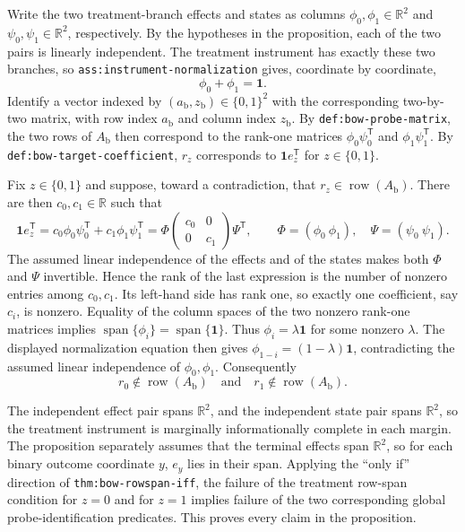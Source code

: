 Write the two treatment-branch effects and states as columns
\(\phi_0,\phi_1\in\mathbb R^2\) and
\(\psi_0,\psi_1\in\mathbb R^2\), respectively.  By the hypotheses in the
proposition, each of the two pairs is linearly independent.  The treatment
instrument has exactly these two branches, so
\texttt{ass:instrument-normalization} gives, coordinate by coordinate,
\[
  \phi_0+\phi_1=\mathbf 1.
\]
Identify a vector indexed by \((a_{\mathrm b},z_{\mathrm b})\in\{0,1\}^2\)
with the corresponding two-by-two matrix, with row index
\(a_{\mathrm b}\) and column index \(z_{\mathrm b}\).  By
\texttt{def:bow-probe-matrix}, the two rows of \(A_{\mathrm b}\) then
correspond to the rank-one matrices
\(\phi_0\psi_0^{\mathsf T}\) and
\(\phi_1\psi_1^{\mathsf T}\).  By
\texttt{def:bow-target-coefficient}, \(r_z\) corresponds to
\(\mathbf 1e_z^{\mathsf T}\) for \(z\in\{0,1\}\).

Fix \(z\in\{0,1\}\) and suppose, toward a contradiction, that
\(r_z\in\operatorname{row}(A_{\mathrm b})\).  There are then
\(c_0,c_1\in\mathbb R\) such that
\[
 \mathbf 1e_z^{\mathsf T}
 =c_0\phi_0\psi_0^{\mathsf T}+c_1\phi_1\psi_1^{\mathsf T}
 =\Phi
   \begin{pmatrix}c_0&0\\0&c_1\end{pmatrix}
   \Psi^{\mathsf T},
 \qquad
 \Phi=(\phi_0\ \phi_1),\quad
 \Psi=(\psi_0\ \psi_1).
\]
The assumed linear independence of the effects and of the states makes both
\(\Phi\) and \(\Psi\) invertible.  Hence the rank of the last expression is
the number of nonzero entries among \(c_0,c_1\).  Its left-hand side has rank
one, so exactly one coefficient, say \(c_i\), is nonzero.  Equality of the
column spaces of the two nonzero rank-one matrices implies
\(\operatorname{span}\{\phi_i\}=\operatorname{span}\{\mathbf 1\}\).
Thus \(\phi_i=\lambda\mathbf 1\) for some nonzero \(\lambda\).  The displayed
normalization equation then gives
\(\phi_{1-i}=(1-\lambda)\mathbf 1\), contradicting the assumed linear
independence of \(\phi_0,\phi_1\).  Consequently
\[
  r_0\notin\operatorname{row}(A_{\mathrm b})
  \quad\text{and}\quad
  r_1\notin\operatorname{row}(A_{\mathrm b}).
\]

The independent effect pair spans \(\mathbb R^2\), and the independent state
pair spans \(\mathbb R^2\), so the treatment instrument is marginally
informationally complete in each margin.  The proposition separately assumes
that the terminal effects span \(\mathbb R^2\), so for each binary outcome
coordinate \(y\), \(e_y\) lies in their span.  Applying the ``only if''
direction of \texttt{thm:bow-rowspan-iff}, the failure of the treatment
row-span condition for \(z=0\) and for \(z=1\) implies failure of the two
corresponding global probe-identification predicates.  This proves every
claim in the proposition.